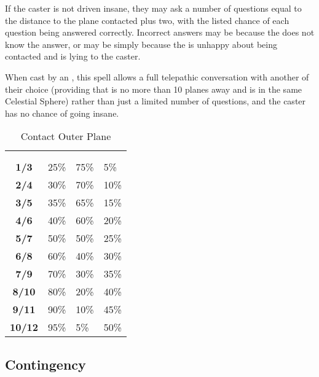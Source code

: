 \begin{multicols*}{2}
If the caster is not driven insane, they may ask a number of questions equal to the distance to the plane contacted plus two, with the listed chance of each question being answered correctly. Incorrect answers may be because the  does not know the answer, or may be simply because the  is unhappy about being contacted and is lying to the caster.

When cast by an , this spell allows a full telepathic conversation with another  of their choice (providing that  is no more than 10 planes away and is in the same Celestial Sphere) rather than just a limited number of questions, and the caster has no chance of going insane.

\begin {table}[H]
  \caption{Contact Outer Plane}\label{tab:Contact Outer Plane}
  \begin{tabularx}{\columnwidth}{>{\bfseries}cYYY}
	\thead{} & \\
	 &  &  & \\
	1/3 & 25\% & 75\% & 5\%\\
	2/4 & 30\% & 70\% & 10\%\\
	3/5 & 35\% & 65\% & 15\%\\
	4/6 & 40\% & 60\% & 20\%\\
	5/7 & 50\% & 50\% & 25\%\\
	6/8 & 60\% & 40\% & 30\%\\
	7/9 & 70\% & 30\% & 35\%\\
	8/10 & 80\% & 20\% & 40\%\\
	9/11 & 90\% & 10\% & 45\%\\
	10/12 & 95\% & 5\% & 50\%
  \end {tabularx}
\end {table}

\subsection{Contingency}\label{spell:Contingency}


\end{multicols*}
